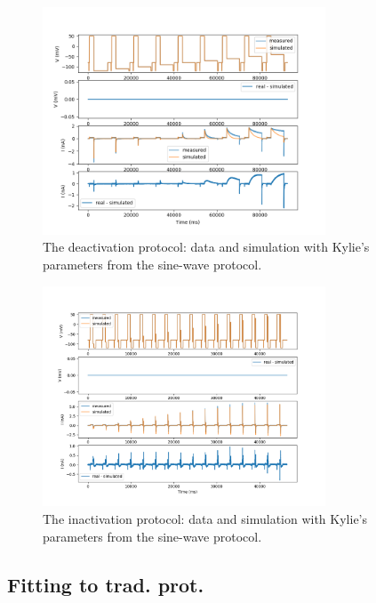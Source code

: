 \documentclass[preprint,authoryear,10pt]{elsarticle}
\begin{document}
\begin{figure}[H]
\centerline{
\includegraphics[width=0.75\textwidth]{fig/deactivation-data-and-sim}
}
\caption{%
The deactivation protocol: data and simulation with Kylie's parameters from the
sine-wave protocol.
}
\label{fig:deactivation}
\end{figure}

\begin{figure}[H]
\centerline{
\includegraphics[width=0.75\textwidth]{fig/inactivation-data-and-sim}
}
\caption{%
The inactivation protocol: data and simulation with Kylie's parameters from the
sine-wave protocol.
}
\label{fig:inactivation}
\end{figure}



\subsection{Fitting to trad. prot.}
\end{document}
